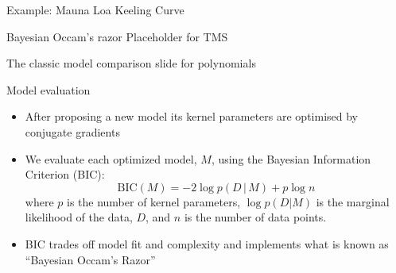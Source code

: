 \begin{frame}{Example: Mauna Loa Keeling Curve}
\vspace{-3.5cm}
\begin{minipage}[t][14cm][t]{1.14\linewidth}
\begin{flushleft}
\hspace{5.5cm}
\vspace{-8cm}
\end{flushleft}
\end{minipage}
\end{frame}

\begin{frame}{Bayesian Occam's razor}
  Placeholder for TMS
  
  The classic model comparison slide for polynomials
\end{frame}

\begin{frame}{Model evaluation}
  \begin{itemize}
    \item After proposing a new model its kernel parameters are optimised by conjugate gradients
    \item We evaluate each optimized model, $M$, using the Bayesian Information Criterion (BIC):
\[
\textrm{BIC}(M) = -2 \log p(D\,|\, M) + p \log n
\]
where $p$ is the number of kernel parameters, $\log p(D|M)$ is the marginal likelihood of the data, $D$, and $n$ is the number of data points.
  \item BIC trades off model fit and complexity and implements what is known as ``Bayesian Occam's Razor'' 
  \end{itemize}
\end{frame}

